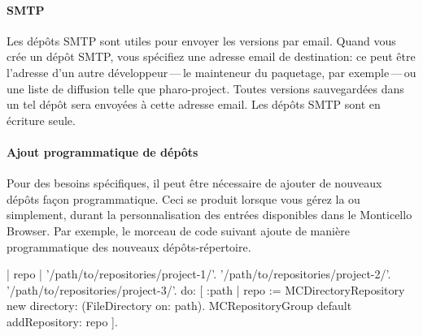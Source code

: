 \documentclass[a4paper,10pt,twoside]{book}
\begin{document}
\paragraph{SMTP} Les dépôts SMTP sont utiles pour envoyer les versions
par email. Quand vous crée un dépôt SMTP, vous spécifiez une adresse
email de destination: ce peut être l'adresse d'un autre
développeur\,---\,le mainteneur du paquetage, par exemple\,---\,ou une
liste de diffusion telle que pharo-project.
Toutes versions sauvegardées dans un tel dépôt sera envoyées à cette
adresse email. Les dépôts SMTP sont en écriture seule.

\paragraph{Ajout programmatique de dépôts}
Pour des besoins spécifiques, il peut être nécessaire de ajouter de nouveaux dépôts façon programmatique. Ceci se produit lorsque vous gérez la  ou simplement, durant la personnalisation des entrées disponibles dans le Monticello Browser. Par exemple, le morceau de code suivant ajoute de manière programmatique des nouveaux dépôts-répertoire.

\begin{code}
| repo |
{'/path/to/repositories/project-1/'. 
'/path/to/repositories/project-2/'. 
'/path/to/repositories/project-3/'. } do: 
[ :path |
	repo := MCDirectoryRepository new directory: 
		(FileDirectory on: path).
	MCRepositoryGroup default addRepository: repo ].
\end{code}

\end{document}
